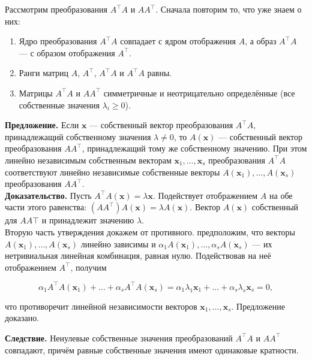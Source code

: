 \documentclass[11pt,a4paper]{article}
\providecommand{\tightlist}{%
      \setlength{\itemsep}{0pt}\setlength{\parskip}{0pt}}
\begin{document}
Рассмотрим преобразования \(A^\top A\) и \(A A^\top\). Сначала повторим
то, что уже знаем о них:

\begin{enumerate}
\def\labelenumi{\arabic{enumi}.}
\tightlist
\item
  Ядро преобразования \(A^\top A\) совпадает с ядром отображения \(A\),
  а образ \(A^\top A\) --- с образом отображения \(A^\top\).
\item
  Ранги матриц \(A\), \(A^\top\), \(A^\top A\) и \(A^\top A\) равны.
\item
  Матрицы \(A^\top A\) и \(A A^\top\) симметричные и неотрицательно
  определённые (все собственные значения \(\lambda_i \ge 0\)).
\end{enumerate}

\textbf{Предложение.} Если \(\mathbf{x}\) --- собственный вектор
преобразования \(A^\top A\), принадлежащий собственному значения
\(\lambda \ne 0\), то \(A(\mathbf{x})\) --- собственный вектор
преобразования \(A A^\top\), принадлежащий тому же собственному
значению. При этом линейно независимым собственным векторам
\(\mathbf{x}_1, \ldots, \mathbf{x}_s\) преобразования \(A^\top A\)
соответствуют линейно независимые собственные векторы
\(A(\mathbf{x}_1), \ldots, A(\mathbf{x}_s)\) преобразования
\(A A^\top\).\\
\textbf{Доказательство.} Пусть
\(A^\top A (\mathbf{x}) = \lambda \mathbf{x}\). Подействует отображением
\(A\) на обе части этого равенства:
\((A A^\top) A(\mathbf{x}) = \lambda A(\mathbf{x})\). Вектор
\(A(\mathbf{x})\) собственный для \(A A\top\) и принадлежит значению
\(\lambda\).\\
Вторую часть утверждения докажем от противного. предположим, что векторы
\(A(\mathbf{x}_1), \ldots, A(\mathbf{x}_s)\) линейно зависимы и
\(\alpha_1 A(\mathbf{x}_1), \ldots, \alpha_s A(\mathbf{x}_s)\) --- их
нетривиальная линейная комбинация, равная нулю. Подействовав на неё
отображением \(A^\top\), получим

\[
  \alpha_1 A^\top A(\mathbf{x}_1) + \ldots + \alpha_s A^\top A(\mathbf{x}_s) = \alpha_1 \lambda_1 \mathbf{x}_1 + \ldots + \alpha_s  \lambda_s \mathbf{x}_s = 0,
\]

что противоречит линейной независимости векторов
\(\mathbf{x}_1, \ldots, \mathbf{x}_s\). Предложение доказано.

\textbf{Следствие.} Ненулевые собственные значения преобразований
\(A^\top A\) и \(A A^\top\) совпадают, причём равные собственные
значения имеют одинаковые кратности.
\end{document}

